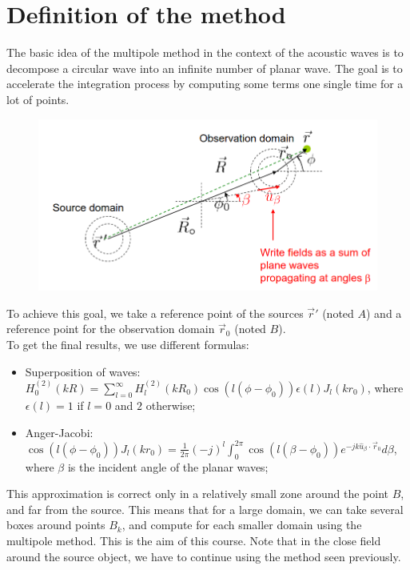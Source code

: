 \documentclass[12pt, openany]{report}
\theoremstyle{definition}
\begin{document}
\section{Definition of the method}
The basic idea of the multipole method in the context of the acoustic waves is to decompose a circular wave into an infinite number of planar wave. The goal is to accelerate the integration process by computing some terms one single time for a lot of points. 
\begin{figure}[H]
	\centering 
	\includegraphics[width=.6\textwidth]{img/multipole.png}
\end{figure}
To achieve this goal, we take a reference point of the sources $\vec r'$ (noted $A$) and a reference point for the observation domain $\vec r_0$ (noted $B$). \\
To get the final results, we use different formulas:
\begin{itemize}
	\item Superposition of waves: $H_0^{(2)}(kR) = \sum_{l=0}^\infty H_l^{(2)}(kR_0)\cos(l(\phi-\phi_0)) \epsilon(l)J_l(kr_0)$, where $\epsilon(l) = 1$ if $l=0$ and $2$ otherwise; 
	\item Anger-Jacobi: $\cos(l(\phi-\phi_0)) J_l(kr_0) = \frac{1}{2\pi} (-j)^l \int_0^{2\pi} \cos(l(\beta-\phi_0)) e^{-jk\hat u_\beta \cdot \vec r_0} d\beta$, where $\beta$ is the incident angle of the planar waves;
\end{itemize}
This approximation is correct only in a relatively small zone around the point $B$, and far from the source. This means that for a large domain, we can take several boxes around points $B_k$, and compute for each smaller domain using the multipole method. This is the aim of this course. Note that in the close field around the source object, we have to continue using the method seen previously. 
\end{document}

